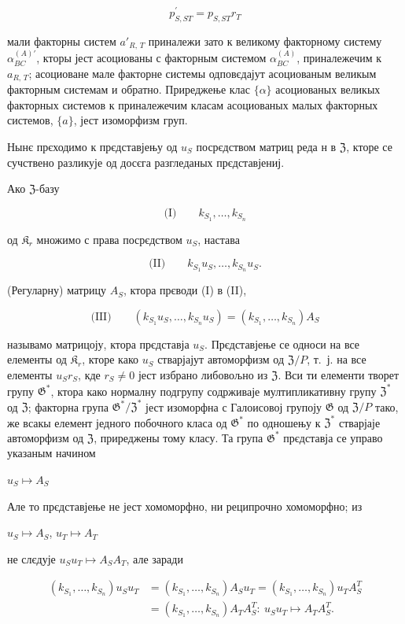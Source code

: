 \documentclass[11pt]{article}
\begin{document}
\[p_{S,ST}^{\prime}=p_{S,ST}r_{T}\]

мали факторны систем \(a'_{R,\,T}\) приналежи зато к великому факторному систему \(\alpha^{(A)\prime}_{BC}\), кторы јест асоциованы с факторным системом \(\alpha^{(A)}_{BC}\), приналежечим к \(a_{R,\,T}\); асоциоване мале факторне системы одповєдајут асоциованым великым факторным системам и обратно. Приреджење клас \(\{\alpha\}\) асоциованых великых факторных системов к приналежечим класам асоциованых малых факторных системов, \(\{a\}\), јест изоморфизм груп.

Нынє прєходимо к прєдставјењу од \(u_S\) посрєдством матриц реда н в \(\mathfrak{Z}\), кторе се сучствено разликује од досєга разгледаных прєдставјениј.

Ако \(\mathfrak Z\)-базу

\[
\text{(I)}\qquad k_{S_1}, \ldots, k_{S_n}
\]

од \(\mathfrak K_r\) множимо с права посрєдством \(u_S\), настава

\[
\text{(II)}\qquad k_{S_1}u_S, \ldots, k_{S_n}u_S.
\]

(Регуларну) матрицу \(A_S\), ктора прєводи (I) в (II),

\[
\text{(III)}\qquad (k_{S_1}u_S, \ldots, k_{S_n}u_S) = (k_{S_1}, \ldots, k_{S_n})A_S
\]

называмо матрицоју, ктора прєдставја \(u_S\). Прєдставјење се односи на все елементы од \(\mathfrak K_{r}\), кторе како \(u_S\) стварјајут автоморфизм од \(\mathfrak Z/P\), т.~ј. на все елементы \(u_Sr_S\), кде \(r_S \neq 0\) јест избрано либовољно из \(\mathfrak Z\). Вси ти елементи творет групу \(\mathfrak G^*\), ктора како нормалну подгрупу содрживаје мултипликативну групу \(\mathfrak Z^*\) од \(\mathfrak Z\); факторна група \(\mathfrak G^*/\mathfrak Z^*\) јест изоморфна с Галоисовој групоју \(\mathfrak G\) од \(\mathfrak Z/P\) тако, же всакы елемент једного побочного класа од \(\mathfrak G^*\) по одношењу к \(\mathfrak Z^*\) стварјаје автоморфизм од \(\mathfrak Z\), приреджены тому класу. Та група \(\mathfrak G^*\) прєдставја се управо указаным начином

\(u_S \mapsto A_S\)

Але то прєдставјење не јест хомоморфно, ни реципрочно хомоморфно; из

\(u_S \mapsto A_S\), \(u_T \mapsto A_T\)

не слєдује \(u_Su_T \mapsto A_SA_T\), але заради

\[
\begin{aligned}
(k_{S_1}, \ldots, k_{S_n})u_Su_T
&=(k_{S_1}, \ldots, k_{S_n})A_Su_T
=(k_{S_1}, \ldots, k_{S_n})u_TA_S^T\\
&=(k_{S_1}, \ldots, k_{S_n})A_TA_S^T:\ u_Su_T\mapsto A_TA_S^T.
\end{aligned}
\]
\end{document}

